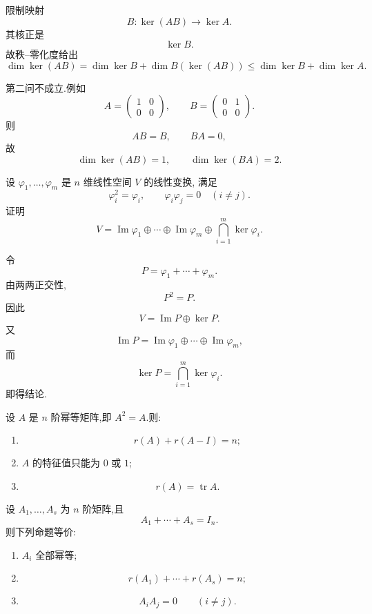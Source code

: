\begin{solution}
限制映射
\[
B:\ker(AB)\to\ker A.
\]
其核正是
\[
\ker B.
\]
故秩--零化度给出
\[
\dim\ker(AB)
=
\dim\ker B
+
\dim B(\ker(AB))
\leq
\dim\ker B+\dim\ker A.
\]

第二问不成立.例如
\[
A=
\begin{pmatrix}1&0\\0&0\end{pmatrix},
\qquad
B=
\begin{pmatrix}0&1\\0&0\end{pmatrix}.
\]
则
\[
AB=B,\qquad BA=0,
\]
故
\[
\dim\ker(AB)=1,\qquad
\dim\ker(BA)=2.
\]
\end{solution}


\begin{example}
设 $\varphi_1,\ldots,\varphi_m$ 是 $n$ 维线性空间 $V$ 的线性变换,
满足
\[
\varphi_i^2=\varphi_i,
\qquad
\varphi_i\varphi_j=0\quad(i\neq j).
\]
证明
\[
V
=
\operatorname{Im}\varphi_1\oplus\cdots\oplus\operatorname{Im}\varphi_m
\oplus
\bigcap\limits_{i=1}^{m}\ker\varphi_i.
\]
\end{example}
\exampleblank

\begin{solution}
令
\[
P=\varphi_1+\cdots+\varphi_m.
\]
由两两正交性,
\[
P^2=P.
\]
因此
\[
V=\operatorname{Im}P\oplus\ker P.
\]
又
\[
\operatorname{Im}P
=
\operatorname{Im}\varphi_1\oplus\cdots\oplus\operatorname{Im}\varphi_m,
\]
而
\[
\ker P=\bigcap\limits_{i=1}^{m}\ker\varphi_i.
\]
即得结论.
\end{solution}


\begin{theorem}[\markstar]
设 $A$ 是 $n$ 阶幂等矩阵,即 $A^2=A$.则:
\begin{enumerate}
    \item
    \[
    r(A)+r(A-I)=n;
    \]
    \item $A$ 的特征值只能为 $0$ 或 $1$;
    \item
    \[
    r(A)=\operatorname{tr}A.
    \]
\end{enumerate}
\end{theorem}


\begin{proposition}[\markstar]
设 $A_1,\ldots,A_s$ 为 $n$ 阶矩阵,且
\[
A_1+\cdots+A_s=I_n.
\]
则下列命题等价:
\begin{enumerate}
    \item $A_i$ 全部幂等;
    \item
    \[
    r(A_1)+\cdots+r(A_s)=n;
    \]
    \item
    \[
    A_iA_j=0\qquad(i\neq j).
    \]
\end{enumerate}
\end{proposition}


